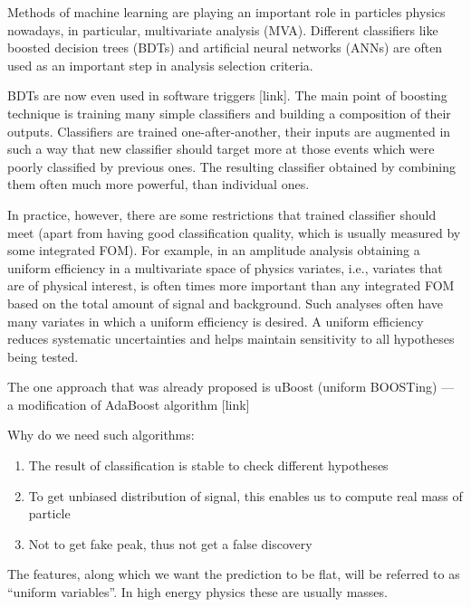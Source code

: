 Methods of machine learning are playing an important role in particles physics nowadays, in particular, multivariate analysis (MVA). 
Different classifiers like boosted decision trees (BDTs) and artificial neural networks (ANNs) are often used as an important step in analysis selection criteria. 

BDTs are now even used in software triggers [link]. The main point of boosting technique is training many simple classifiers and building a composition of their outputs.
Classifiers are trained one-after-another, their inputs are augmented in such a way that new classifier should target more at those events which were poorly classified by previous ones. The resulting classifier obtained by combining them often much more powerful, than individual ones.


In practice, however, there are some restrictions that trained classifier should meet (apart from having good classification quality, which is usually measured by some integrated FOM). For example, in an amplitude analysis obtaining a uniform efficiency in a multivariate space of physics variates, i.e., variates that are of physical interest, is often times more important than any integrated FOM based on the total amount of signal and background. Such analyses often have many variates in which a uniform efficiency is desired. A uniform efficiency reduces systematic uncertainties and helps maintain sensitivity to all hypotheses being tested.

The one approach that was already proposed is uBoost (uniform BOOSTing) --- a modification of AdaBoost algorithm [link]

Why do we need such algorithms:

\begin{enumerate}
	\item The result of classification is stable to check different hypotheses
	\item To get unbiased distribution of signal, this enables us to compute real mass of particle
	\item Not to get fake peak, thus not get a false discovery
\end{enumerate}

The features, along which we want the prediction to be flat, will be referred to as 
``uniform variables''. In high energy physics these are usually masses.
